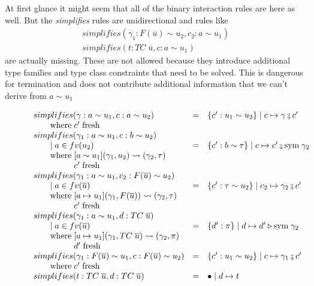 At first glance it might seem that all of the binary interaction rules are here
as well. But the \textit{simplifies} rules are unidirectional and rules like
\[
\begin{array}{l}
simplifies(\gamma_1 : F(\overline{u}) \sim u_2, c_2 : a \sim u_1)
\\
simplifies(t : TC \; \overline{u}, c : a \sim u_1)
\end{array}
\]
are actually missing. These are not allowed because they introduce additional
type families and type class constraints that need to be solved. This is
dangerous for termination and does not contribute additional information that we
can't derive from $a \sim u_1$

\begin{figure}
\small
{}
\[
\begin{array}{l c l}
simplifies(\gamma : a \sim u_1, c : a \sim u_2) &=& \{c' : u_1 \sim u_2\} \mid c
\mapsto \gamma \fctrans c'
\\ \where c' \; \text{fresh}
\\
simplifies(\gamma_1 : a \sim u_1, c : b \sim u_2)
\\ \guard a \in fv(u_2) &=& \{c' : b \sim \tau\} \mid c \mapsto c' \fctrans
\text{sym} \; \gamma_2
\\ \where [a \sim u_1](\gamma_1, u_2) \rightsquigarrow (\gamma_2, \tau)
\\ \whereindent c' \; \text{fresh}
\\
simplifies(\gamma_1 : a \sim u_1, c_2 : F(\overline{u}) \sim u_2)
\\ \guard a \in fv(\overline{u}) &=& \{c': \tau \sim u_2\} \mid c_2 \mapsto
\gamma_2 \fctrans c'
\\ \where [a \mapsto u_1](\gamma_1, F(\overline{u})) \rightsquigarrow (\gamma_2,
\tau)
\\ \whereindent c' \; \text{fresh}
\\
simplifies(\gamma_1 : a \sim u_1, d : TC \; \overline{u})
\\ \guard a \in fv(\overline{u}) &=& \{d' : \pi\} \mid d \mapsto
d' \triangleright \text{sym} \; \gamma_2
\\ \where [a \mapsto u_1](\gamma_1, TC \; \overline{u}) \rightsquigarrow
(\gamma_2, \pi)
\\ \whereindent d' \; \text{fresh}
\\
simplifies(\gamma_1 : F(\overline{u}) \sim u_1, c : F(\overline{u}) \sim u_2)
&=& \{c' : u_1 \sim u_2\} \mid c \mapsto \gamma_1 \fctrans c'
\\ \where c' \; \text{fresh}
\\
simplifies(t : TC \; \overline{u}, d : TC \; \overline{u}) &=& \bullet \mid d
\mapsto t
\end{array}
\]
\end{figure}

